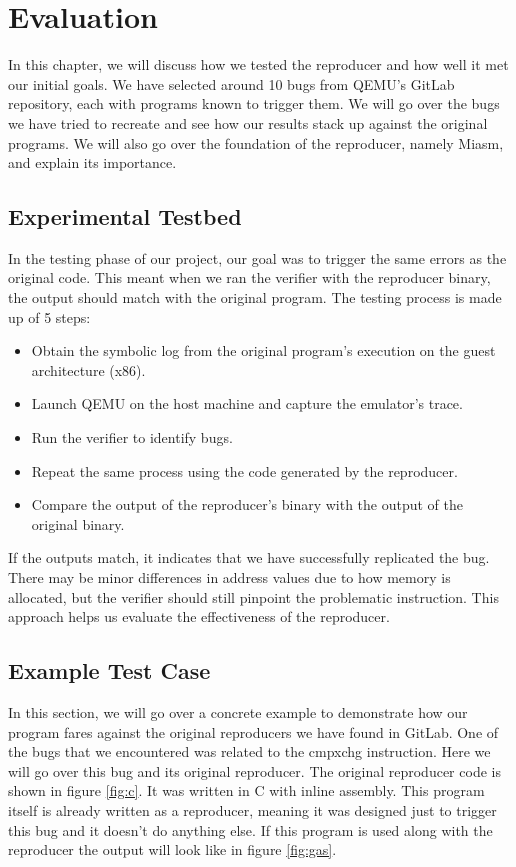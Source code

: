 
\chapter{Evaluation}\label{chapter:evaluation}
In this chapter, we will discuss how we tested the reproducer and how well it met our initial goals.
We have selected around 10 bugs from \ac{QEMU}'s GitLab repository, each with programs known to trigger them.
We will go over the bugs we have tried to recreate and see how our results stack up against the original programs. 
We will also go over the foundation of the reproducer, namely Miasm, and explain its importance.

\section{Experimental Testbed}
In the testing phase of our project, our goal was to trigger the same errors as the original code.
This meant when we ran the verifier with the reproducer binary, the output should match with the original program.
The testing process is made up of 5 steps:
\begin{itemize}
    \item Obtain the symbolic log from the original program's execution on the guest architecture (x86).
    \item Launch \ac{QEMU} on the host machine and capture the emulator's trace.
    \item Run the verifier to identify bugs.
    \item Repeat the same process using the code generated by the reproducer.
    \item Compare the output of the reproducer's binary with the output of the original binary.
\end{itemize}

If the outputs match, it indicates that we have successfully replicated the bug.
There may be minor differences in address values due to how memory is allocated, but the verifier should still pinpoint the problematic instruction.
This approach helps us evaluate the effectiveness of the reproducer.

\section{Example Test Case}
In this section, we will go over a concrete example to demonstrate how our program fares against the original reproducers we have found in GitLab.
One of the bugs that we encountered was related to the cmpxchg instruction.
Here we will go over this bug and its original reproducer.
The original reproducer code is shown in figure \ref{fig:c}.
It was written in C with inline assembly.
This program itself is already written as a reproducer, meaning it was designed just to trigger this bug and it doesn't do anything else.
If this program is used along with the reproducer the output will look like in figure \ref{fig:gas}.

